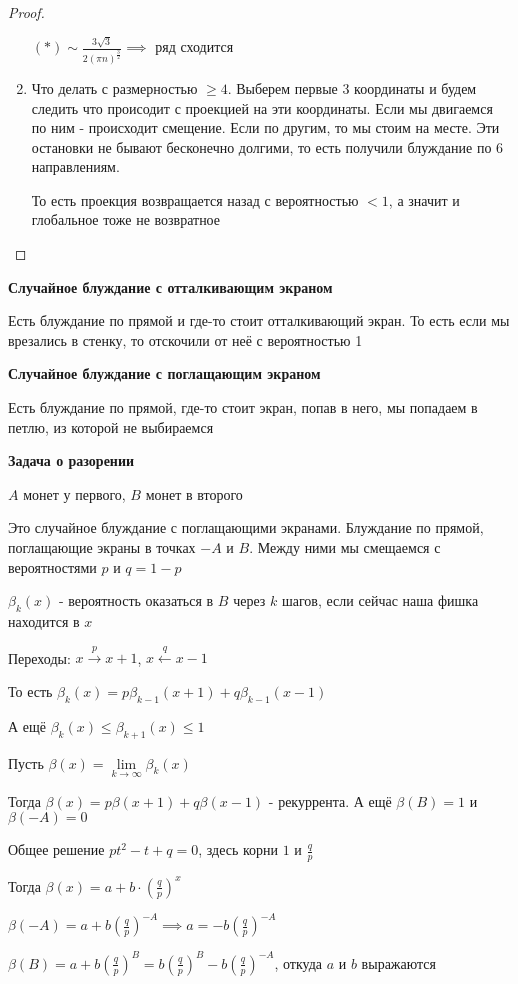 \begin{proof}
\begin{enumerate}
{            $(*) \sim \frac{3\sqrt{3}}{2 (\pi n)^{\frac{3}{2}}} \implies $ ряд сходится
        }
        \item {
            Что делать с размерностью $\geqslant 4$. Выберем первые 3 координаты и будем следить что происодит с проекцией на эти координаты. 
            Если мы двигаемся по ним - происходит смещение. Если по другим, то мы стоим на месте. Эти остановки не бывают бесконечно долгими, то есть получили блуждание по 6 направлениям.

            То есть проекция возвращается назад с вероятностью $< 1$, а значит и глобальное тоже не возвратное
        }
    \end{enumerate}
\end{proof}

\begin{remark}
    \textbf{Случайное блуждание с отталкивающим экраном}

    Есть блуждание по прямой и где-то стоит отталкивающий экран. То есть если мы врезались в стенку, то отскочили от неё с вероятностью 1
\end{remark}

\begin{remark}
    \textbf{Случайное блуждание с поглащающим экраном}
    
    Есть блуждание по прямой, где-то стоит экран, попав в него, мы попадаем в петлю, из которой не выбираемся
\end{remark}

\begin{example}
    \textbf{Задача о разорении}

    $A$ монет у первого, $B$ монет в второго

    Это случайное блуждание с поглащающими экранами. Блуждание по прямой, поглащающие экраны в точках $-A$ и $B$.
    Между ними мы смещаемся с вероятностями $p$ и $q = 1 - p$

    $\beta_k (x)$ - вероятность оказаться в $B$ через $k$ шагов, если сейчас наша фишка находится в $x$

    Переходы: $x \overset{p}{\rightarrow} x + 1$, $x \overset{q}{\leftarrow} x - 1$

    То есть $\beta_k (x) = p \beta_{k - 1} (x + 1) + q \beta_{k - 1} (x - 1)$

    А ещё $\beta_k (x) \leqslant \beta_{k + 1} (x) \leqslant 1$

    Пусть $\beta (x) = \lim\limits_{k \to \infty} \beta_k (x)$

    Тогда $\beta (x) = p \beta (x + 1) + q \beta (x - 1)$ - рекуррента. А ещё $\beta (B) = 1$ и $\beta (-A) = 0$

    Общее решение $pt^2 - t + q = 0$, здесь корни $1$ и $\frac{q}{p}$

    Тогда $\beta (x) = a + b \cdot \left( \frac{q}{p} \right)^x$
    
    $\beta (-A) = a + b \left( \frac{q}{p} \right)^{-A} \implies a = -b \left( \frac{q}{p}\right)^{-A}$

    $\beta (B) = a + b \left( \frac{q}{p} \right)^B = b \left( \frac{q}{p} \right)^B - b \left( \frac{q}{p} \right)^{-A}$, откуда $a$ и $b$ выражаются
\end{example}

